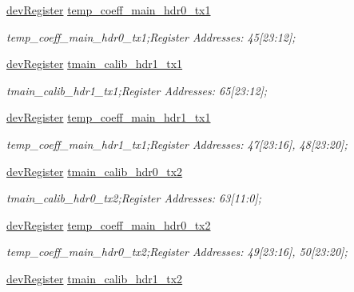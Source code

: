 \begin{DoxyCompactItemize}
\mbox{\hyperlink{classdev_register}{dev\+Register}} \mbox{\hyperlink{class_o_p_t3101_registers_a43de72f8397b6aa83c403210a5ccb893}{temp\+\_\+coeff\+\_\+main\+\_\+hdr0\+\_\+tx1}}
\begin{DoxyCompactList}\small\item\em temp\+\_\+coeff\+\_\+main\+\_\+hdr0\+\_\+tx1;Register Addresses\+: 45\mbox{[}23\+:12\mbox{]}; \end{DoxyCompactList}\item 
\mbox{\hyperlink{classdev_register}{dev\+Register}} \mbox{\hyperlink{class_o_p_t3101_registers_a6b4f0e10b860ce62b81e0b9ae4cf5a44}{tmain\+\_\+calib\+\_\+hdr1\+\_\+tx1}}
\begin{DoxyCompactList}\small\item\em tmain\+\_\+calib\+\_\+hdr1\+\_\+tx1;Register Addresses\+: 65\mbox{[}23\+:12\mbox{]}; \end{DoxyCompactList}\item 
\mbox{\hyperlink{classdev_register}{dev\+Register}} \mbox{\hyperlink{class_o_p_t3101_registers_aebf596aa50d1836c94288764ed24b345}{temp\+\_\+coeff\+\_\+main\+\_\+hdr1\+\_\+tx1}}
\begin{DoxyCompactList}\small\item\em temp\+\_\+coeff\+\_\+main\+\_\+hdr1\+\_\+tx1;Register Addresses\+: 47\mbox{[}23\+:16\mbox{]}, 48\mbox{[}23\+:20\mbox{]}; \end{DoxyCompactList}\item 
\mbox{\hyperlink{classdev_register}{dev\+Register}} \mbox{\hyperlink{class_o_p_t3101_registers_abfb6f6db1232b0b0b9deb4afc64459ec}{tmain\+\_\+calib\+\_\+hdr0\+\_\+tx2}}
\begin{DoxyCompactList}\small\item\em tmain\+\_\+calib\+\_\+hdr0\+\_\+tx2;Register Addresses\+: 63\mbox{[}11\+:0\mbox{]}; \end{DoxyCompactList}\item 
\mbox{\hyperlink{classdev_register}{dev\+Register}} \mbox{\hyperlink{class_o_p_t3101_registers_a350244ce20b08f3ae3a44b999eeac68e}{temp\+\_\+coeff\+\_\+main\+\_\+hdr0\+\_\+tx2}}
\begin{DoxyCompactList}\small\item\em temp\+\_\+coeff\+\_\+main\+\_\+hdr0\+\_\+tx2;Register Addresses\+: 49\mbox{[}23\+:16\mbox{]}, 50\mbox{[}23\+:20\mbox{]}; \end{DoxyCompactList}\item 
\mbox{\hyperlink{classdev_register}{dev\+Register}} \mbox{\hyperlink{class_o_p_t3101_registers_ade57144933135b55ff86f3b7438ae780}{tmain\+\_\+calib\+\_\+hdr1\+\_\+tx2}}

\end{DoxyCompactItemize}
